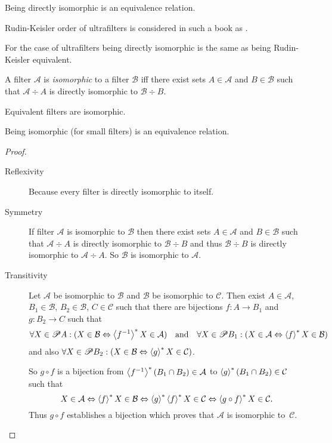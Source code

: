 \begin{cor}
Being directly isomorphic is an equivalence relation.
\end{cor}
Rudin-Keisler order of ultrafilters is
considered in such a book as \cite{comfort-ultra}.
\begin{obvious}
For the case of ultrafilters being directly isomorphic is the same
as being Rudin-Keisler equivalent.\end{obvious}
\begin{defn}
A filter $\mathcal{A}$ is \emph{isomorphic}
to a filter $\mathcal{B}$ iff there exist sets $A\in\mathcal{A}$
and $B\in\mathcal{B}$ such that $\mathcal{A}\div A$ is directly
isomorphic to $\mathcal{B}\div B$.\end{defn}
\begin{obvious}
Equivalent filters are isomorphic.\end{obvious}
\begin{thm}
Being isomorphic (for small filters) is an equivalence relation.\end{thm}
\begin{proof}
~
\begin{description}
\item [{Reflexivity}] Because every filter is directly isomorphic to itself.
\item [{Symmetry}] If filter $\mathcal{A}$ is isomorphic to $\mathcal{B}$
then there exist sets $A\in\mathcal{A}$ and $B\in\mathcal{B}$ such
that $\mathcal{A}\div A$ is directly isomorphic to $\mathcal{B}\div B$
and thus $\mathcal{B}\div B$ is directly isomorphic to $\mathcal{A}\div A$.
So $\mathcal{B}$ is isomorphic to $\mathcal{A}$.
\item [{Transitivity}] Let $\mathcal{A}$ be isomorphic to $\mathcal{B}$
and $\mathcal{B}$ be isomorphic to $\mathcal{C}$. Then exist $A\in\mathcal{A}$,
$B_{1}\in\mathcal{B}$, $B_{2}\in\mathcal{B}$, $C\in\mathcal{C}$
such that there are bijections $f:A\rightarrow B_{1}$ and $g:B_{2}\rightarrow C$
such that
\[
\forall X\in\mathscr{P} A:(X\in\mathcal{B}\Leftrightarrow\left\langle f^{-1}\right\rangle ^{\ast}X\in\mathcal{A})\quad\text{and}\quad\forall X\in\mathscr{P} B_{1}:(X\in\mathcal{A}\Leftrightarrow\left\langle f\right\rangle ^{\ast}X\in\mathcal{B})
\]
and also $\forall X\in\mathscr{P} B_{2}:(X\in\mathcal{B}\Leftrightarrow\left\langle g\right\rangle ^{\ast}X\in\mathcal{C})$.


So $g\circ f$ is a bijection from $\left\langle f^{-1}\right\rangle ^{\ast}(B_{1}\cap B_{2})\in\mathcal{A}$
to $\left\langle g\right\rangle ^{\ast}(B_{1}\cap B_{2})\in\mathcal{C}$ such that
\[
X\in\mathcal{A}\Leftrightarrow\left\langle f\right\rangle ^{\ast}X\in\mathcal{B}\Leftrightarrow\left\langle g\right\rangle ^{\ast}\left\langle f\right\rangle ^{\ast}X\in\mathcal{C}\Leftrightarrow\left\langle g\circ f\right\rangle ^{\ast}X\in\mathcal{C}.
\]
Thus $g\circ f$ establishes a bijection which proves that $\mathcal{A}$
is isomorphic to~$\mathcal{C}$.

\end{description}
\end{proof}
